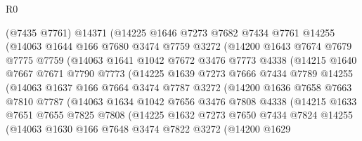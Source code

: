 \begin{lexlean}{R0}
\begin{coremodule}
            (@7435 @7761)
            @14371
            (@14225
              @1646
              @7273
              @7682
              @7434
              @7761
              @14255
              (@14063
                @1644
                @166
                @7680
                @3474
                @7759
                @3272
                (@14200
                  @1643
                  @7674
                  @7679
                  @7775
                  @7759
                  (@14063
                    @1641
                    @1042
                    @7672
                    @3476
                    @7773
                    @4338
                    (@14215
                      @1640
                      @7667
                      @7671
                      @7790
                      @7773
                      (@14225
                        @1639
                        @7273
                        @7666
                        @7434
                        @7789
                        @14255
                        (@14063
                          @1637
                          @166
                          @7664
                          @3474
                          @7787
                          @3272
                          (@14200
                            @1636
                            @7658
                            @7663
                            @7810
                            @7787
                            (@14063
                              @1634
                              @1042
                              @7656
                              @3476
                              @7808
                              @4338
                              (@14215
                                @1633
                                @7651
                                @7655
                                @7825
                                @7808
                                (@14225
                                  @1632
                                  @7273
                                  @7650
                                  @7434
                                  @7824
                                  @14255
                                  (@14063
                                    @1630
                                    @166
                                    @7648
                                    @3474
                                    @7822
                                    @3272
                                    (@14200
                                      @1629

\end{coremodule}
\end{lexlean}
